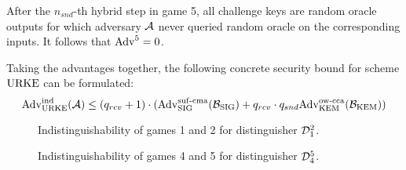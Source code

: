 After the $n_{snd}$-th hybrid step in game 5, all challenge keys are random oracle outputs for which adversary $\mathcal{A}$ never queried random oracle on the corresponding inputs.
It follows that $\mathrm{Adv}^5=0$.

Taking the advantages together, the following concrete security bound for scheme $\mathrm{URKE}$ can be formulated:
\[\mathrm{Adv}_{\mathrm{URKE}}^{\mathrm{ind}}(\mathcal{A}) \leq (q_{rcv}+1)\cdot(\mathrm{Adv}_{\mathrm{SIG}}^{\mathrm{suf}\text{-}\mathrm{cma}}(\mathcal{B}_{\mathrm{SIG}})+q_{rcv}\cdot q_{snd}\mathrm{Adv}_{\mathrm{KEM}}^{\mathrm{ow}\text{-}\mathrm{cca}}(\mathcal{B}_{\mathrm{KEM}}))\] 


\begin{figure}[!ht]
    \centering
    
    \caption{Indistinguishability of games 1 and 2 for distinguisher $\mathcal{D}_1^2$.}
    \label{fig:urke:ind:games1_2}
\end{figure}

\begin{figure}[!ht]
    \centering
    
    \caption{Indistinguishability of games 4 and 5 for distinguisher $\mathcal{D}_4^5$.}
    \label{fig:urke:ind:games4_5}
\end{figure}